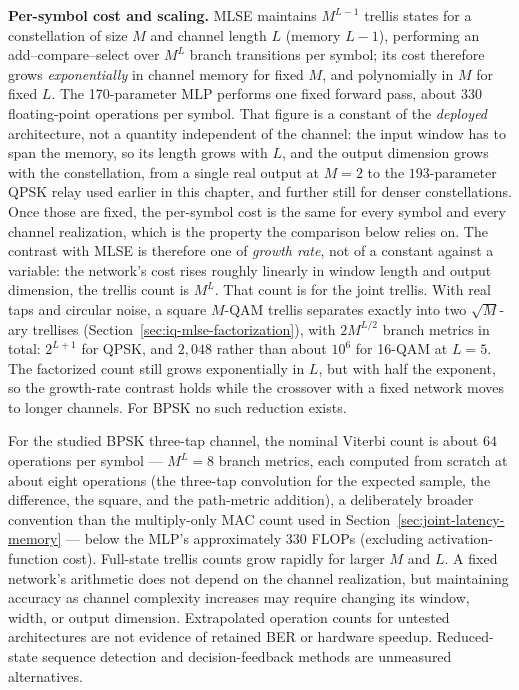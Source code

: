 \textbf{Per-symbol cost and scaling.} MLSE maintains $M^{L-1}$ trellis states for a constellation of size $M$ and channel length $L$ (memory $L-1$), performing an add--compare--select over $M^{L}$ branch transitions per symbol; its cost therefore grows \emph{exponentially} in channel memory for fixed $M$, and polynomially in $M$ for fixed $L$. The 170-parameter MLP performs one fixed forward pass, about $330$ floating-point operations per symbol. That figure is a constant of the \emph{deployed} architecture, not a quantity independent of the channel: the input window has to span the memory, so its length grows with $L$, and the output dimension grows with the constellation, from a single real output at $M=2$ to the $193$-parameter QPSK relay used earlier in this chapter, and further still for denser constellations. Once those are fixed, the per-symbol cost is the same for every symbol and every channel realization, which is the property the comparison below relies on. The contrast with MLSE is therefore one of \emph{growth rate}, not of a constant against a variable: the network's cost rises roughly linearly in window length and output dimension, the trellis count is $M^{L}$. That count is for the joint trellis. With real taps and circular noise, a square $M$-QAM trellis separates exactly into two $\sqrt{M}$-ary trellises (Section~\ref{sec:iq-mlse-factorization}), with $2M^{L/2}$ branch metrics in total: $2^{L+1}$ for QPSK, and $2{,}048$ rather than about $10^{6}$ for 16-QAM at $L=5$. The factorized count still grows exponentially in $L$, but with half the exponent, so the growth-rate contrast holds while the crossover with a fixed network moves to longer channels. For BPSK no such reduction exists.

For the studied BPSK three-tap channel, the nominal Viterbi count is about $64$ operations per symbol --- $M^{L}=8$ branch metrics, each computed from scratch at about eight operations (the three-tap convolution for the expected sample, the difference, the square, and the path-metric addition), a deliberately broader convention than the multiply-only MAC count used in Section~\ref{sec:joint-latency-memory} --- below the MLP's approximately $330$ FLOPs (excluding activation-function cost). Full-state trellis counts grow rapidly for larger $M$ and $L$. A fixed network's arithmetic does not depend on the channel realization, but maintaining accuracy as channel complexity increases may require changing its window, width, or output dimension. Extrapolated operation counts for untested architectures are not evidence of retained BER or hardware speedup. Reduced-state sequence detection \cite{EyuboqluQureshi1988RSSE} and decision-feedback methods are unmeasured alternatives.

